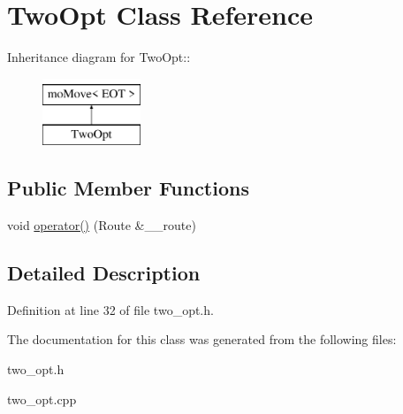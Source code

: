 \hypertarget{classTwoOpt}{
\section{Two\-Opt Class Reference}
\label{classTwoOpt}
}
Inheritance diagram for Two\-Opt::\begin{figure}[H]
\begin{center}
\leavevmode
\includegraphics[height=2cm]{classTwoOpt}
\end{center}
\end{figure}
\subsection*{Public Member Functions}
\begin{CompactItemize}
\item 
\hypertarget{classTwoOpt_ff87d1649a33d42a6d64e8d314ed1af0}{
void \hyperlink{classTwoOpt_ff87d1649a33d42a6d64e8d314ed1af0}{operator()} (Route \&\_\-\_\-route)}
\label{classTwoOpt_ff87d1649a33d42a6d64e8d314ed1af0}

\end{CompactItemize}


\subsection{Detailed Description}




Definition at line 32 of file two\_\-opt.h.

The documentation for this class was generated from the following files:\begin{CompactItemize}
\item 
two\_\-opt.h\item 
two\_\-opt.cpp\end{CompactItemize}
